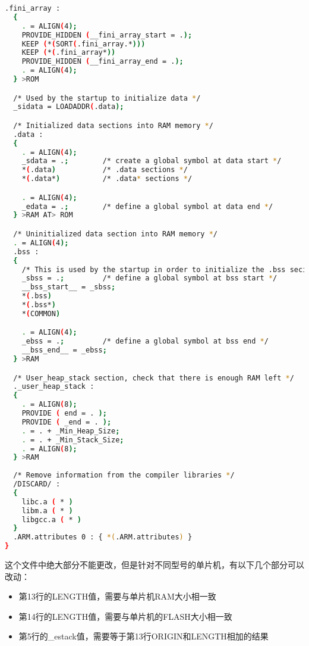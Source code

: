 \begin{lstlisting}[language=bash, style=customStyleMakefile, caption=stm32\_flash.ld]
  .fini_array :
  {
    . = ALIGN(4);
    PROVIDE_HIDDEN (__fini_array_start = .);
    KEEP (*(SORT(.fini_array.*)))
    KEEP (*(.fini_array*))
    PROVIDE_HIDDEN (__fini_array_end = .);
    . = ALIGN(4);
  } >ROM

  /* Used by the startup to initialize data */
  _sidata = LOADADDR(.data);

  /* Initialized data sections into RAM memory */
  .data : 
  {
    . = ALIGN(4);
    _sdata = .;        /* create a global symbol at data start */
    *(.data)           /* .data sections */
    *(.data*)          /* .data* sections */

    . = ALIGN(4);
    _edata = .;        /* define a global symbol at data end */
  } >RAM AT> ROM

  /* Uninitialized data section into RAM memory */
  . = ALIGN(4);
  .bss :
  {
    /* This is used by the startup in order to initialize the .bss secion */
    _sbss = .;         /* define a global symbol at bss start */
    __bss_start__ = _sbss;
    *(.bss)
    *(.bss*)
    *(COMMON)

    . = ALIGN(4);
    _ebss = .;         /* define a global symbol at bss end */
    __bss_end__ = _ebss;
  } >RAM

  /* User_heap_stack section, check that there is enough RAM left */
  ._user_heap_stack :
  {
    . = ALIGN(8);
    PROVIDE ( end = . );
    PROVIDE ( _end = . );
    . = . + _Min_Heap_Size;
    . = . + _Min_Stack_Size;
    . = ALIGN(8);
  } >RAM
  
  /* Remove information from the compiler libraries */
  /DISCARD/ :
  {
    libc.a ( * )
    libm.a ( * )
    libgcc.a ( * )
  }
  .ARM.attributes 0 : { *(.ARM.attributes) }
}
\end{lstlisting}
这个文件中绝大部分不能更改，但是针对不同型号的单片机，有以下几个部分可以改动：
\begin{itemize}
	\item 第13行的LENGTH值，需要与单片机RAM大小相一致
	\item 第14行的LENGTH值，需要与单片机的FLASH大小相一致
	\item 第5行的\_estack值，需要等于第13行ORIGIN和LENGTH相加的结果
\end{itemize}

